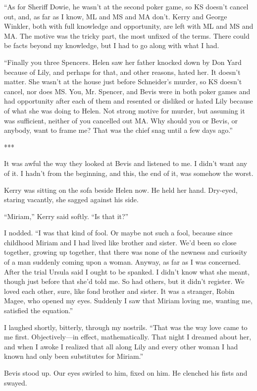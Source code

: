 \documentclass{novel}
\begin{document}
“As for Sheriff Dowie, he wasn’t at the second poker game, so KS doesn’t cancel out, and, as far as I know, ML and MS and MA don’t. Kerry and George Winkler, both with full knowledge and opportunity, are left with ML and MS and MA. The motive was the tricky part, the most unfixed of the terms. There could be facts beyond my knowledge, but I had to go along with what I had.

“Finally you three Spencers. Helen saw her father knocked down by Don Yard because of Lily, and perhaps for that, and other reasons, hated her. It doesn’t matter. She wasn’t at the house just before Schneider’s murder, so KS doesn’t cancel, nor does MS. You, Mr. Spencer, and Bevis were in both poker games and had opportunity after each of them and resented or disliked or hated Lily because of what she was doing to Helen. Not strong motive for murder, but assuming it was sufficient, neither of you cancelled out MA. Why should you or Bevis, or anybody, want to frame me? That was the chief snag until a few days ago.”

***

It was awful the way they looked at Bevis and listened to me. I didn’t want any of it. I hadn’t from the beginning, and this, the end of it, was somehow the worst.

Kerry was sitting on the sofa beside Helen now. He held her hand. Dry-eyed, staring vacantly, she sagged against his side.

“Miriam,” Kerry said softly. “Is that it?”

I nodded. “I was that kind of fool. Or maybe not such a fool, because since childhood Miriam and I had lived like brother and sister. We’d been so close together, growing up together, that there was none of the newness and curiosity of a man suddenly coming upon a woman. Anyway, as far as I was concerned. After the trial Ursula said I ought to be spanked. I didn’t know what she meant, though just before that she’d told me. So had others, but it didn’t register. We loved each other, sure, like fond brother and sister. It was a stranger, Robin Magee, who opened my eyes. Suddenly I saw that Miriam loving me, wanting me, satisfied the equation.”

I laughed shortly, bitterly, through my nostrils. “That was the way love came to me first. Objectively—in effect, mathematically. That night I dreamed about her, and when I awoke I realized that all along Lily and every other woman I had known had only been substitutes for Miriam.”

Bevis stood up. Our eyes swirled to him, fixed on him. He clenched his fists and swayed.
\end{document}
